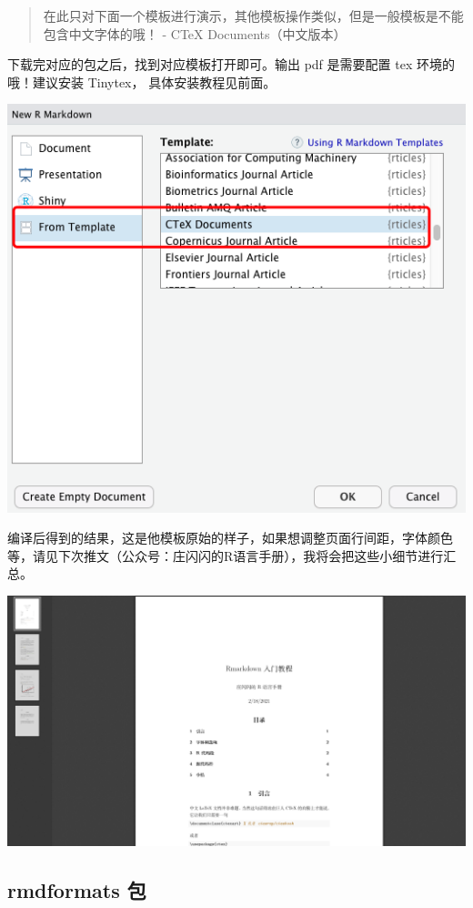 \documentclass[
]{book}
\begin{document}
\begin{quote}
在此只对下面一个模板进行演示，其他模板操作类似，但是一般模板是不能包含中文字体的哦！ -
CTeX Documents（中文版本）
\end{quote}

下载完对应的包之后，找到对应模板打开即可。输出 pdf 是需要配置 tex
环境的哦！建议安装 Tinytex， 具体安装教程见前面。

\includegraphics{images/paste-24B1DE88.png}

编译后得到的结果，这是他模板原始的样子，如果想调整页面行间距，字体颜色等，请见下次推文（公众号：庄闪闪的R语言手册），我将会把这些小细节进行汇总。

\includegraphics{images/paste-AEF2F3EB.png}

\hypertarget{rmdformats-ux5305}{%
\subsection{rmdformats 包}\label{rmdformats-ux5305}}
\end{document}
